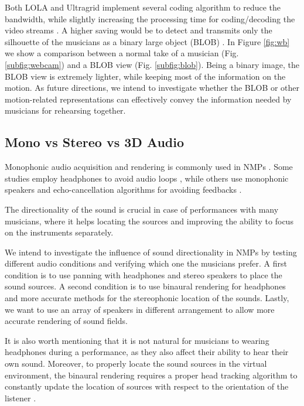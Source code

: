 \documentclass[conference]{IEEEtran}
\begin{document}
Both LOLA and Ultragrid implement several coding algorithm to reduce the bandwidth, while slightly increasing the processing time for coding/decoding the video streams \cite{drioli2013networked,holub2006high}. A higher saving would be to detect and transmits only the silhouette of the musicians as a binary large object (BLOB) \cite{camurri2010visual}. In Figure \ref{fig:wb} we show a comparison between a normal take of a musician (Fig. \ref{subfig:webcam}) and a BLOB view (Fig. \ref{subfig:blob}).
Being a binary image, the BLOB view is extremely lighter, while keeping most of the information on the motion. As future directions, we intend to investigate whether the BLOB or other motion-related representations can effectively convey the information needed by musicians for rehearsing together. 


\subsection{Mono vs Stereo vs 3D Audio}
Monophonic audio acquisition and rendering is commonly used in NMPs \cite{CIM2018}. Some studies employ headphones to avoid audio loops \cite{RottondiFeature}, while others use monophonic speakers and echo-cancellation algorithms for avoiding feedbacks \cite{drioli2013networked}. 

The directionality of the sound is crucial %
in case of performances with many musicians, where it helps locating the sources and improving the ability to focus on the instruments separately. 

We intend to investigate the influence of sound directionality in NMPs by testing different audio conditions and verifying which one the musicians prefer. A first condition is to use panning with headphones and stereo speakers to place the sound sources. A second condition is to use binaural rendering for headphones and more accurate methods for the stereophonic location of the sounds. Lastly, we want to use an array of speakers in different arrangement to allow more accurate rendering of sound fields. 

It is also worth mentioning that it is not natural for musicians to wearing headphones during a performance, as they also affect their ability to hear their own sound. Moreover, to properly locate the sound sources in the virtual environment, the binaural rendering requires a proper head tracking algorithm to constantly update the location of sources with respect to the orientation of the listener \cite{Bonacina2016}.
\end{document}
